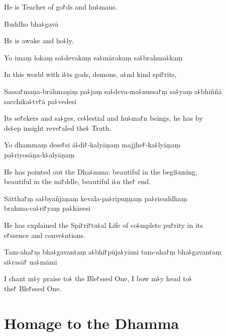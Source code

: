 \begin{english}
  He is Teacher of go꜓ds and hu꜕mans.
\end{english}

Buddho bha꜕gavā

\begin{english}
  He is awake and ho꜕ly.
\end{english}

Yo imaṃ lokaṃ sa꜕devakaṃ sa꜕mārakaṃ sa꜕brahma꜕kaṃ

\begin{english}
  In this world with i꜕ts gods, demons, a꜕nd kind spi꜓rits,
\end{english}

Sassa꜓maṇa-brāhmaṇiṃ pa꜕jaṃ sa꜕deva-ma꜕nussa꜓ṃ sa꜕yaṃ a꜕bhiññā sacchika꜕tv꜓ā pa꜕vedesi

\begin{english}
  Its se꜓ekers and sa꜕ges, ce꜕lestial and hu꜕ma꜓n beings, he has by \\de꜕ep insight reve꜓aled the꜕ Truth.
\end{english}

Yo dhammaṃ dese꜓si ā꜕di꜓-kalyāṇaṃ majjhe꜓-ka꜕lyāṇaṃ \\pa꜕riyosāṇa-k꜕alyāṇaṃ

\begin{english}
  He has pointed out the Dha꜕mma: beautiful in the begi꜕nning, \\beautiful in the mi꜓ddle, beautiful i꜕n the꜓ end.
\end{english}

Sāttha꜓ṃ sa꜕byañjaṇaṃ kevala-pa꜕ripuṇṇaṃ pa꜕risuddhaṃ \\brahma-ca꜕ri꜓yaṃ pa꜕kāsesi

\begin{english}
  He has explained the Spi꜓ri꜓tu꜕al Life of co꜕mplete pu꜓rity in its \\e꜓ssence and conve꜕ntions.
\end{english}

Tam-aha꜓ṃ bha꜕gavantaṃ a꜕bhi꜓pūja꜕yāmi tam-aha꜓ṃ bha꜕gavantaṃ \\si꜕rasā꜓ na꜕māmi

\begin{english}
  I chant m꜕y praise to꜕ the Ble꜓ssed One, I bow m꜕y head to꜕ \\the꜓ Ble꜓ssed One.
\end{english}

\clearpage

\chapter{Homage to the Dhamma}                      %

